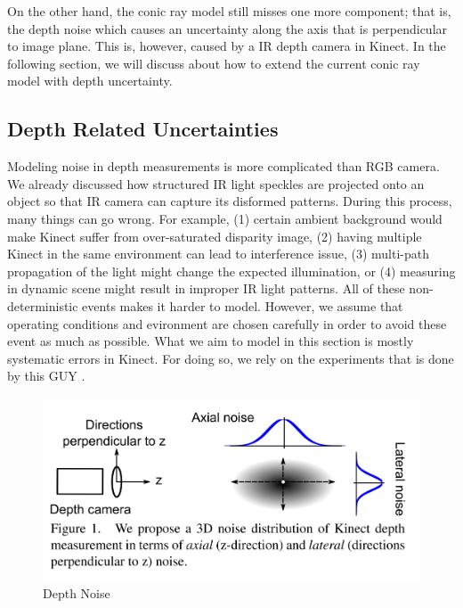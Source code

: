 \documentclass[a4paper]{report}
\numberwithin{figure}{section}
\begin{document}
On the other hand, the conic ray model still misses one more component; 
that is, the depth noise which causes an uncertainty 
along the axis that is perpendicular to image plane. 
This is, however, caused by a IR depth camera in Kinect. 
In the following section, we will discuss about how to extend the current conic ray 
model with depth uncertainty.

\subsection{Depth Related Uncertainties} \label{sb_sc_depth_uncertainty}

Modeling noise in depth measurements is more complicated than RGB camera. We 
already discussed how structured IR light speckles are projected onto an object 
so that IR camera can capture its disformed patterns. During this process, 
many things can go wrong. For example, (1) certain ambient background would make 
Kinect suffer from over-saturated disparity image, (2) having multiple Kinect 
in the same environment can lead to interference issue, (3) multi-path 
propagation of the light might change the expected illumination, or (4) measuring 
in dynamic scene might result in improper IR light patterns. All of these 
non-deterministic events makes it harder to model. However, 
we assume that operating conditions and evironment are chosen carefully 
in order to avoid these event as much as possible. What we aim to model in this 
section is mostly systematic errors in Kinect. For doing so, we rely on 
the experiments that is done by this GUY \cite{}. 

\begin{figure}[H]
	\centering
  \includegraphics[width=0.7\linewidth,natwidth=640,natheight=640]
  {fig/ref_imgs/kinect_noise_model.png}
  \caption{Depth Noise}
	\label{fig:depth_noise}
\end{figure}
\end{document}
